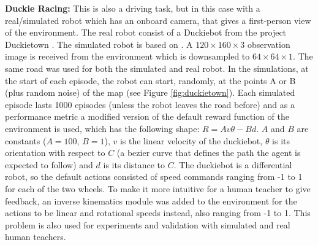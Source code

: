 \textbf{Duckie Racing:} This is also a driving task, but in this case with a real/simulated robot which has an onboard camera, that gives a first-person view of the environment. The real robot consist of a Duckiebot from the project Duckietown \cite{Paull2017}. The simulated robot is based on \cite{gym_duckietown}. A $120\times160\times3$ observation image is received from the environment which is downsampled to $64\times64\times1$. The same road was used for both the simulated and real robot. In the simulations, at the start of each episode, the robot can start, randomly, at the points A or B (plus random noise) of the map (see Figure \ref{fig:duckietown}). Each simulated episode lasts 1000 episodes (unless the robot leaves the road before) and as a performance metric a modified version of the default reward function of the environment is used, which has the following shape: $R = Av\theta - Bd$. $A$ and $B$ are constants ($A=100$, $B=1$), $v$ is the linear velocity of the duckiebot, $\theta$ is its orientation with respect to $C$ (a bezier curve that defines the path the agent is expected to follow) and $d$ is its distance to $C$. The duckiebot is a differential robot, so the default actions consisted of speed commands ranging from -1 to 1 for each of the two wheels. To make it more intuitive for a human teacher to give feedback, an inverse kinematics module was added to the environment for the actions to be linear and rotational speeds instead, also ranging from -1 to 1. This problem is also used for experiments and validation with simulated and real human teachers.

